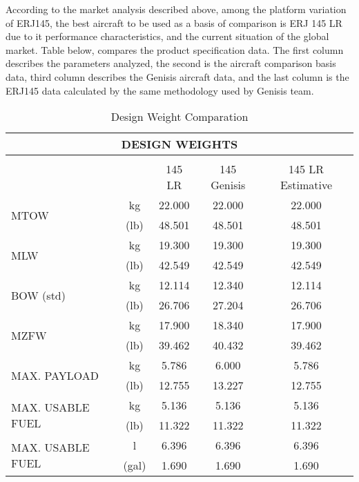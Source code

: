 According to the market analysis described above, among the platform variation of ERJ145,
the best aircraft to be used as a basis of comparison is ERJ 145 LR due to
it performance characteristics,  and the current situation of the global market.
Table below, compares the product specification data. The first column
describes the parameters analyzed, the second is the aircraft comparison basis data, third column describes the Genisis aircraft data, and the last column is the ERJ145 data calculated by the same methodology used by Genisis team.

\begin{table}[htbp]
  \centering
  \caption{Design Weight Comparation}
    \begin{tabular}{rcccc}
    \toprule
    \multicolumn{5}{c}{\multirow{2}[1]{*}{DESIGN WEIGHTS}} \\
    \midrule
    \multicolumn{5}{c}{} \\
    \multicolumn{2}{c}{} & 145 LR & 145 Genisis & 145 LR Estimative \\
    \multicolumn{1}{l}{\multirow{2}[2]{*}{MTOW}} & kg    & 22.000 & 22.000 & 22.000 \\
    \multicolumn{1}{l}{} & (lb)  & 48.501 & 48.501 & 48.501 \\
    \multicolumn{1}{l}{\multirow{2}[2]{*}{MLW}} & kg    & 19.300 & 19.300 & 19.300 \\
    \multicolumn{1}{l}{} & (lb)  & 42.549 & 42.549 & 42.549 \\
    \multicolumn{1}{l}{\multirow{2}[2]{*}{BOW (std)}} & kg    & 12.114 & 12.340 & 12.114 \\
    \multicolumn{1}{l}{} & (lb)  & 26.706 & 27.204 & 26.706 \\
    \multicolumn{1}{l}{\multirow{2}[2]{*}{MZFW}} & kg    & 17.900 & 18.340 & 17.900 \\
    \multicolumn{1}{l}{} & (lb)  & 39.462 & 40.432 & 39.462 \\
    \multicolumn{1}{l}{\multirow{2}[2]{*}{MAX. PAYLOAD}} & kg    & 5.786 & 6.000 & 5.786 \\
    \multicolumn{1}{l}{} & (lb)  & 12.755 & 13.227 & 12.755 \\
    \multicolumn{1}{l}{\multirow{2}[2]{*}{MAX. USABLE FUEL}} & kg    & 5.136 & 5.136 & 5.136 \\
    \multicolumn{1}{l}{} & (lb)  & 11.322 & 11.322 & 11.322 \\
    \multicolumn{1}{l}{\multirow{2}[2]{*}{MAX. USABLE FUEL}} & l     & 6.396 & 6.396 & 6.396 \\
    \multicolumn{1}{l}{} & (gal) & 1.690 & 1.690 & 1.690 \\
    \bottomrule
    \end{tabular}%
  \label{tab:designcomparing}%
\end{table}%



